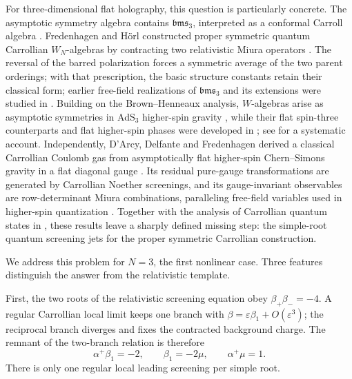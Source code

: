 \documentclass[11pt,a4paper]{article}
\numberwithin{equation}{section}
\theoremstyle{remark}
\newcommand{\eps}{\varepsilon}
\begin{document}
For three-dimensional flat holography, this question is particularly concrete.  The asymptotic
symmetry algebra contains $\mathfrak{bms}_3$, interpreted as a conformal Carroll algebra
\cite{BarnichCompere,DuvalGibbonsHorvathy,Ruzziconi}.  Fredenhagen and H\"orl
constructed proper symmetric quantum Carrollian $W_N$-algebras by contracting two
relativistic Miura operators \cite{FredenhagenHoerl}.  The reversal of the barred polarization
forces a symmetric average of the two parent orderings; with that prescription, the basic
structure constants retain their classical form; earlier free-field realizations of
$\mathfrak{bms}_3$ and its extensions were studied in \cite{BanerjeeJatkarMukhiNeogi}.
Building on the Brown--Henneaux analysis, $W$-algebras arise as asymptotic symmetries in
AdS$_3$ higher-spin gravity
\cite{BrownHenneaux,HenneauxRey,CampoleoniFredenhagenPfenningerTheisen}, while their flat spin-three
counterparts and flat higher-spin phases were developed in
\cite{AfsharEtAl,GonzalezEtAl,AmmonEtAl}; see
\cite{CampoleoniFredenhagenBook} for a systematic account.  Independently, D'Arcy, Delfante and
Fredenhagen derived a classical Carrollian Coulomb gas from asymptotically flat higher-spin
Chern--Simons gravity in a flat diagonal gauge \cite{DArcyDelfanteFredenhagen}.  Its residual
pure-gauge transformations are generated by Carrollian Noether screenings, and its
gauge-invariant observables are row-determinant Miura combinations, paralleling free-field
variables used in higher-spin quantization \cite{CampoleoniFredenhagenRaeymaekers}.  Together with the
analysis of Carrollian quantum states in \cite{FredenhagenProhazkaTiefenbacher}, these results
leave a sharply defined missing step: the simple-root quantum screening jets for the proper
symmetric Carrollian construction.

We address this problem for $N=3$, the first nonlinear case.  Three features distinguish the
answer from the relativistic template.

First, the two roots of the relativistic screening equation obey
$\beta_+\beta_-=-4$.  A regular Carrollian local limit keeps one branch with
$\beta=\eps\beta_1+O(\eps^3)$; the reciprocal branch diverges and fixes the contracted
background charge.  The remnant of the two-branch relation is therefore
\begin{equation}
  \alpha^+\beta_1=-2,
  \qquad \beta_1=-2\mu,
  \qquad \alpha^+\mu=1.
  \label{eq:intro-locus}
\end{equation}
There is only one regular local leading screening per simple root.
\end{document}
